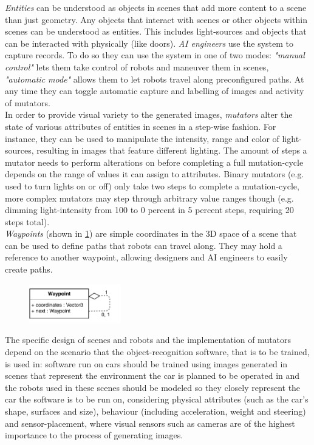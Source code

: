 \emph{Entities} can be understood as objects in scenes that add more content to a scene than just geometry. Any objects that interact with scenes or other objects within scenes can be understood as entities. This includes light-sources and objects that can be interacted with physically (like doors).
\emph{\acs{AI} engineers} use the system to capture records. To do so they can use the system in one of two modes: \emph{"manual control"} lets them take control of robots and maneuver them in scenes, \emph{"automatic mode"} allows them to let robots travel along preconfigured paths. At any time they can toggle automatic capture and labelling of images and activity of mutators.\\
In order to provide visual variety to the generated images, \emph{mutators} alter the state of various attributes of entities in scenes in a step-wise fashion. For instance, they can be used to manipulate the intensity, range and color of light-sources, resulting in images that feature different lighting. The amount of steps a mutator needs to perform alterations on before completing a full mutation-cycle depends on the range of values it can assign to attributes. Binary mutators (e.g. used to turn lights on or off) only take two steps to complete a mutation-cycle, more complex mutators may step through arbitrary value ranges though (e.g. dimming light-intensity from 100 to 0 percent in 5 percent steps, requiring 20 steps total). \\
\emph{Waypoints} (shown in \ref{fig:classes-waypoint}) are simple coordinates in the 3D space of a scene that can be used to define paths that robots can travel along. They may hold a reference to another waypoint, allowing designers and \acs{AI} engineers to easily create paths.  
\begin{figure}[t]
    \centering
    \includegraphics[width=4cm]{tex/img/ch04/Classes_Waypoint.pdf}
    \label{fig:classes-waypoint}
\end{figure}
The specific design of scenes and robots and the implementation of mutators depend on the scenario that the object-recognition software, that is to be trained, is used in: software run on cars should be trained using images generated in scenes that represent the environment the car is planned to be operated in and the robots used in these scenes should be modeled so they closely represent the car the software is to be run on, considering physical attributes (such as the car's shape, surfaces and size), behaviour (including acceleration, weight and steering)  and sensor-placement, where visual sensors such as cameras are of the highest importance to the process of generating images.

